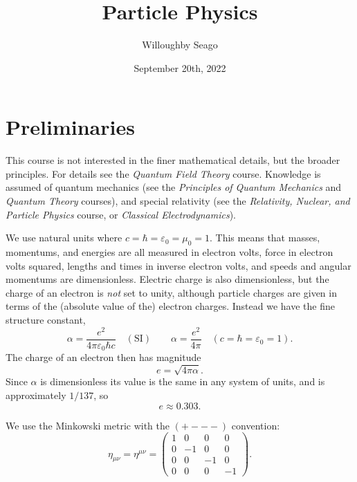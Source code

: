 \documentclass[fleqn]{NotesClass}
\title{Particle Physics}
\author{Willoughby Seago}
\date{September 20th, 2022}
\newcommand{\course}[1]{\textit{#1}}
\begin{document}
    \frontmatter
    \titlepage
    \tableofcontents
    \listoffigures
    \mainmatter
    
    \chapter{Preliminaries}
    This course is not interested in the finer mathematical details, but the broader principles.
    For details see the \course{Quantum Field Theory} course.
    Knowledge is assumed of quantum mechanics (see the \course{Principles of Quantum Mechanics} and \course{Quantum Theory} courses), and special relativity (see the \course{Relativity, Nuclear, and Particle Physics} course, or \course{Classical Electrodynamics}).
    
    We use natural units where \(c = \hbar = \varepsilon_0 = \mu_0 = 1\).
    This means that masses, momentums, and energies are all measured in electron volts, force in electron volts squared, lengths and times in inverse electron volts, and speeds and angular momentums are dimensionless.
    Electric charge is also dimensionless, but the charge of an electron is  \emph{not} set to unity, although particle charges are given in terms of the (absolute value of the) electron charges.
    Instead we have the fine structure constant,
    \begin{equation}
        \alpha = \frac{e^2}{4\pi \varepsilon_0 \hbar c} \quad (\text{SI}) \qquad \alpha = \frac{e^2}{4\pi} \quad (c = \hbar = \varepsilon_0 = 1).
    \end{equation}
    The charge of an electron then has magnitude
    \begin{equation}
        e = \sqrt{4\pi \alpha}.
    \end{equation}
    Since \(\alpha\) is dimensionless its value is the same in any system of units, and is approximately \(1/137\), so
    \begin{equation}
        e \approx \num{0.303}.
    \end{equation}
    
    We use the Minkowski metric with the \(({+}{-}{-}{-})\) convention:
    \begin{equation}
        \eta_{\mu\nu} = \eta^{\mu\nu} = 
        \begin{pmatrix}
            1 & 0 & 0 & 0\\
            0 & -1 & 0 & 0\\
            0 & 0 & -1 & 0\\
            0 & 0 & 0 & -1
        \end{pmatrix}
        .
    \end{equation}
    
\end{document}
